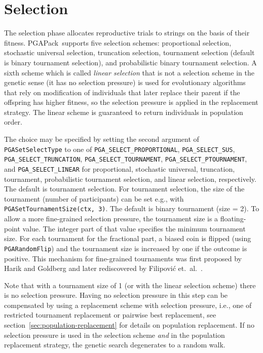 \documentclass{report}
\newcommand{\pga}{PGAPack}
\begin{document}
\section{Selection}\label{sec:selection}

The selection phase allocates reproductive trials to strings on the basis of
their fitness.  \pga\ supports five selection schemes: proportional selection,
stochastic universal selection, truncation selection, tournament
selection (default is binary tournament selection), and probabilistic
binary tournament selection. A sixth scheme which is called
\textit{linear selection} that is not a selection scheme in
the genetic sense (it has no selection pressure) is used for
evolutionary algorithms that rely on modification of individuals that
later replace their parent if the offspring has higher fitness, so the
selection pressure is applied in the replacement strategy. The linear
scheme is guaranteed to return individuals in population order.

\begin{sloppypar}
The choice may be specified by setting the
second argument of {\tt PGASetSelectType} to one of
\verb+PGA_SELECT_PROPORTIONAL+, \verb+PGA_SELECT_SUS+,
\verb+PGA_SELECT_TRUNCATION+, \verb+PGA_SELECT_TOURNAMENT+,
\verb+PGA_SELECT_PTOURNAMENT+, and \verb+PGA_SELECT_LINEAR+
for proportional, stochastic universal, truncation, tournament,
probabilistic tournament selection, and linear selection, respectively.
The default is tournament selection. For tournament
selection, the size of the tournament (number of participants) can be
set e.g., with \verb+PGASetTournamentSize(ctx, 3)+. The default is binary
tournament (size = 2). To allow a more fine-grained selection pressure,
the tournament size is a floating-point value. The integer part of
that value specifies the minimum tournament size. For each tournament
for the fractional part, a biased coin is flipped (using \verb+PGARandomFlip+)
and the tournament size is increased by one if the outcome is positive.
This mechanism for fine-grained tournaments was first proposed by Harik
and Goldberg \cite{HG96} and later rediscovered by Filipovi\'{c}
et.~al.\ \cite{FKTL00}.

Note that with a tournament size of 1 (or with
the linear selection scheme) there is no
selection pressure. Having no selection pressure in this step can be
compensated by using a replacement scheme with selection pressure, i.e.,
one of restricted tournament replacement or pairwise best replacement,
see section~\ref{sec:population-replacement} for details on population
replacement. If no selection pressure is used in the selection scheme
\textit{and} in the population replacement strategy, the genetic search
degenerates to a random walk.
\end{sloppypar}
\end{document}
